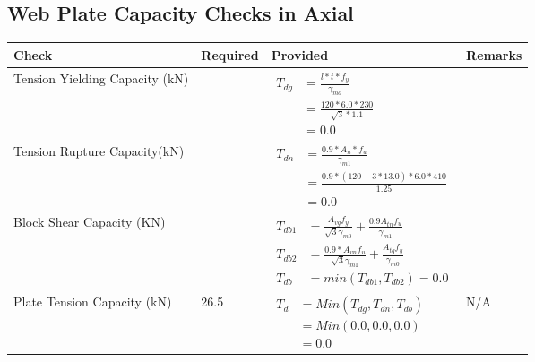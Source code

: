 \documentclass{article}%
\begin{document}
%
\subsection{Web Plate Capacity Checks in Axial}%
\label{subsec:WebPlateCapacityChecksinAxial}%
\renewcommand{\arraystretch}{1.2}%
\begin{longtable}{|p{4cm}|p{6cm}|p{5.5cm}|p{1.5cm}|}%
\hline%
\rowcolor{OsdagGreen}%
Check&Required&Provided&Remarks\\%
\hline%
\endhead%
\hline%
Tension Yielding Capacity (kN)&&$\begin{aligned} T_{dg} &= \frac{l*t*f_y}{\gamma_{mo}}\\ &=\frac{120*6.0*230}{\sqrt{3}*1.1}\\ &=0.0\end{aligned}$&\\%
\hline%
Tension Rupture Capacity(kN)&&$\begin{aligned} T_{dn} &= \frac{0.9*A_{n}*f_u}{\gamma_{m1}}\\ &=\frac{0.9*(120-3*13.0)*6.0*410}{1.25}\\ &=0.0\end{aligned}$&\\%
\hline%
Block Shear Capacity (KN)&&$\begin{aligned}T_{db1} &= \frac{A_{vg} f_{y}}{\sqrt{3} \gamma_{m0}} + \frac{0.9 A_{tn} f_{u}}{\gamma_{m1}}\\ T_{db2} &= \frac{0.9*A_{vn} f_{u}}{\sqrt{3} \gamma_{m1}} + \frac{A_{tg} f_{y}}{\gamma_{m0}}\\ T_{db} &= min(T_{db1}, T_{db2})= 0.0\end{aligned}$&\\%
\hline%
Plate Tension Capacity (kN)&26.5&$\begin{aligned} T_d &= Min(T_{dg},T_{dn},T_{db})\\ &= Min(0.0,0.0,0.0)\\ &=0.0\end{aligned}$&N/A\\%
\hline%
\end{longtable}

%
\end{document}

